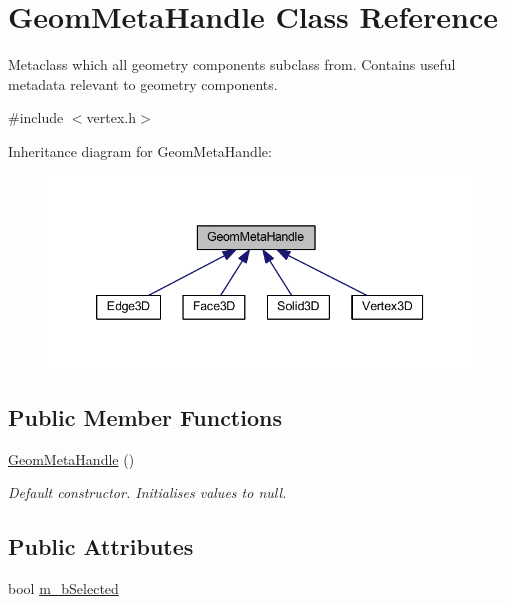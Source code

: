 \hypertarget{class_geom_meta_handle}{\section{Geom\-Meta\-Handle Class Reference}
\label{class_geom_meta_handle}
}


Metaclass which all geometry components subclass from. Contains useful metadata relevant to geometry components.  




{\ttfamily \#include $<$vertex.\-h$>$}



Inheritance diagram for Geom\-Meta\-Handle\-:
\nopagebreak
\begin{figure}[H]
\begin{center}
\leavevmode
\includegraphics[width=342pt]{class_geom_meta_handle__inherit__graph}
\end{center}
\end{figure}
\subsection*{Public Member Functions}
\begin{DoxyCompactItemize}
\item 
\hypertarget{class_geom_meta_handle_a1787f612c3a943eda6368722713681f9}{\hyperlink{class_geom_meta_handle_a1787f612c3a943eda6368722713681f9}{Geom\-Meta\-Handle} ()}\label{class_geom_meta_handle_a1787f612c3a943eda6368722713681f9}

\begin{DoxyCompactList}\small\item\em Default constructor. Initialises values to null. \end{DoxyCompactList}\end{DoxyCompactItemize}
\subsection*{Public Attributes}
\begin{DoxyCompactItemize}
\item 
bool \hyperlink{class_geom_meta_handle_a545e915bdbffcafcf5cd9381b404874c}{m\-\_\-b\-Selected}
\end{DoxyCompactItemize}


